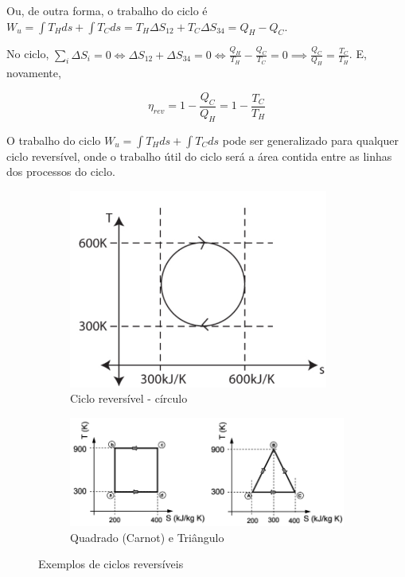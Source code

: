Ou, de outra forma, o trabalho do ciclo é $W_u = \int T_H ds + \int T_C ds = T_H \Delta S_{12} +  T_C \Delta S_{34} = Q_H - Q_C$.


No ciclo, $\sum_i \Delta S_i = 0 \Longleftrightarrow \Delta S_{12} + \Delta S_{34} = 0 \Longleftrightarrow \frac{Q_H}{T_H} - \frac{Q_C}{T_C} = 0 \implies \frac{Q_C}{Q_H} = \frac{T_C}{T_H}$. E, novamente,

\begin{equation}
    \eta_{rev} = 1 - \frac{Q_C}{Q_H} = 1 - \frac{T_C}{T_H}
\end{equation}

\begin{examplebox}

O trabalho do ciclo $W_u = \int T_H ds + \int T_C ds $ pode ser generalizado para qualquer ciclo reversível, onde o trabalho útil do ciclo será a área contida entre as linhas dos processos do ciclo.

\begin{figure}[H]
    \centering
    \begin{subfigure}{0.32\textwidth}
        \centering
        \includegraphics[width=\textwidth]{images/ciclo-circulo.png}
        \caption{Ciclo reversível - círculo}
        \label{fig:rev-circulo}
    \end{subfigure}
    \hfill
    \begin{subfigure}{0.62\textwidth}
        \centering
        \includegraphics[width=\textwidth]{images/ciclos-triangulo.png}
        \caption{Quadrado (Carnot) e Triângulo}
        \label{fig:rev-triangulo}
    \end{subfigure}
    \caption{Exemplos de ciclos reversíveis}
\end{figure}


\end{examplebox}
